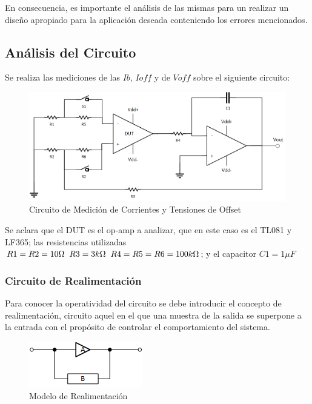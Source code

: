 En consecuencia, es importante el análisis de las mismas para un realizar un diseño apropiado para la aplicación deseada conteniendo los errores mencionados. 

\vspace{3cm}

\subsection{Análisis del Circuito}

Se realiza las mediciones de las $Ib$, $Ioff$ y de $Voff$ sobre el siguiente circuito:

\begin{figure}[h]
    \centering
    \includegraphics[scale = 0.65]{../Ejercicio2-MediciondeBias/Informe/circuito.png}
    \caption{Circuito de Medición de Corrientes y Tensiones de Offset}
    \label{ej2cir}
\end{figure}

Se aclara que el DUT es el op-amp a analizar, que en este caso es el TL081 y LF365; las resistencias utilizadas $R1 = R2 = 10\Omega \hspace{0.2cm} R3 = 3k\Omega \hspace{0.2cm} R4 = R5 = R6 = 100k\Omega$; y el capacitor $C1 = 1\mu F$

\subsubsection{Circuito de Realimentación}

Para conocer la operatividad del circuito se debe introducir el concepto de realimentación, circuito aquel en el que una muestra de la salida se superpone a la entrada con el propósito de controlar el comportamiento del sistema. 

\begin{figure}[h]
    \centering
    \includegraphics[scale = 1.5]{../Ejercicio2-MediciondeBias/Informe/realimentacion.png}
    \caption{Modelo de Realimentación}
    \label{ej2reali}
\end{figure}

